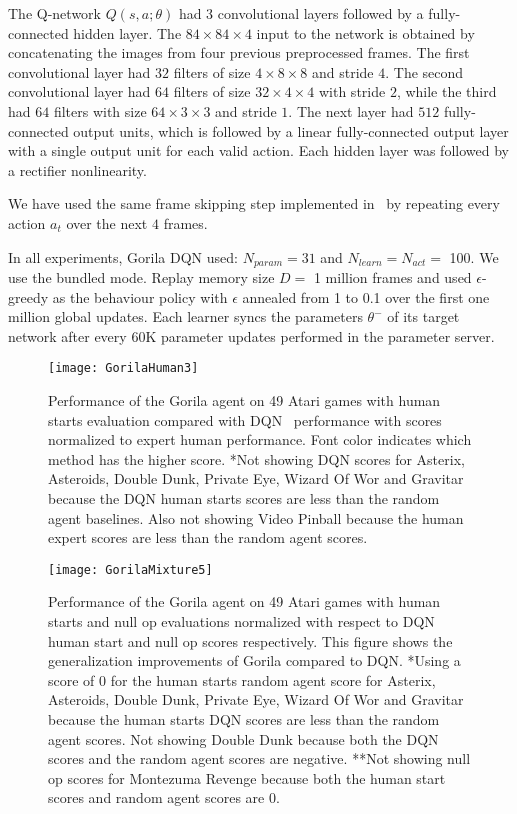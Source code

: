 \documentclass{article}
\begin{document}
The Q-network $Q(s,a;\theta)$ had 3 convolutional layers followed by a fully-connected hidden layer.
The $84\times 84\times 4$ input to the network is obtained by concatenating the images from four previous preprocessed frames.
The first convolutional layer had $32$ filters of size $4\times 8\times 8$ and stride $4$. The second convolutional layer had $64$ filters of size $32\times 4\times 4$ with stride $2$, while the third had $64$ filters with size $64\times 3\times 3$ and stride $1$. The next layer had $512$ fully-connected output units, which is followed by a linear fully-connected output layer with a single output unit for each valid action. 
Each hidden layer was followed by a rectifier nonlinearity.

We have used the same frame skipping step implemented in~\cite{mnih-dqn-2015} by repeating every action $a_t$ over the next $4$ frames. 

In all experiments, Gorila DQN used: $N_{param}=31$ and $N_{learn} = N_{act} =$ 100. We use the bundled mode. Replay memory size $D=$ 1 million frames and used $\epsilon$-greedy as the behaviour policy with $\epsilon$ annealed from 1 to 0.1 over the first one million global updates.
Each learner syncs the parameters $\theta^-$ of its target network after every 60K parameter updates performed in the parameter server.


\begin{figure*}[!ht]
	\vskip -0.1in
	\begin{center}
		\centerline{\texttt{[image: GorilaHuman3]}}
		\caption{Performance of the Gorila agent on 49 Atari games with human starts evaluation compared with DQN~\cite{mnih-dqn-2015} performance with scores normalized to expert human performance.  Font color indicates which method has the higher score. *Not showing DQN scores for Asterix, Asteroids, Double Dunk, Private Eye, Wizard Of Wor and Gravitar because the DQN human starts scores are less than the random agent baselines. Also not showing Video Pinball because the human expert scores are less than the random agent scores.}
		\label{fig:humanstarts}
	\end{center}
	\vskip -0.2in
\end{figure*}

\begin{figure*} [!ht]
	\vskip -0.1in
	\begin{center}
		\centerline{\texttt{[image: GorilaMixture5]}}
		\caption{Performance of the Gorila agent on 49 Atari games with human starts and null op evaluations normalized with respect to DQN human start and null op scores respectively. This figure shows the generalization improvements of Gorila compared to DQN. *Using a score of 0 for the human starts random agent score for Asterix, Asteroids, Double Dunk, Private Eye, Wizard Of Wor and Gravitar because the human starts DQN scores are less than the random agent scores. Not showing Double Dunk because both the DQN scores and the random agent scores are negative. **Not showing null op scores for Montezuma Revenge because both the human start scores and random agent scores are 0.
		}
		\label{fig:humanstarts1}
	\end{center}
	\vskip -0.2in
\end{figure*}
\end{document}
